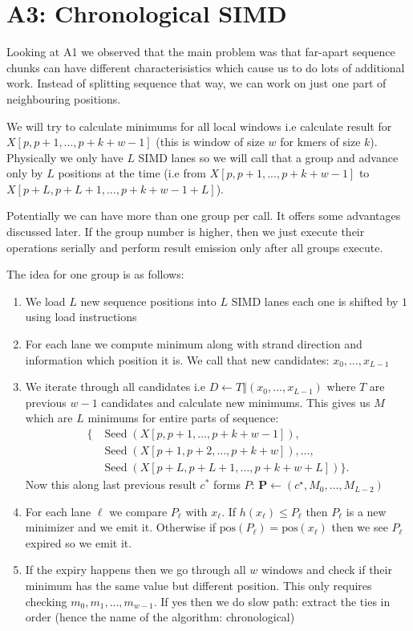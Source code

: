 \section{A3: Chronological SIMD}
\label{sec:rewrite-v8}

Looking at A1 we observed that the main problem was that far-apart sequence chunks can have different characterisistics which cause us to do lots of additional work. Instead of splitting sequence that way, we can work on just one part of neighbouring positions.

We will try to calculate minimums for all local windows i.e calculate result for $X[p, p+1, ..., p+k+w-1]$ (this is window of size $w$ for kmers of size $k$).
Physically we only have $L$ SIMD lanes so we will call that a group and advance only by $L$ positions at the time (i.e from $X[p, p+1, ..., p+k+w-1]$ to $X[p+L, p+L+1, ..., p+k+w-1+L]$).

Potentially we can have more than one group per call. It offers some advantages discussed later. If the group number is higher, then we just execute their operations serially and perform result emission only after all groups execute.

The idea for one group is as follows:
\begin{enumerate}
  \item We load $L$ new sequence positions into $L$ SIMD lanes each one is shifted by $1$ using load instructions
  \item For each lane we compute minimum along with strand direction and information which position it is. We call that new candidates: $x_0,\ldots,x_{L-1}$
  \item We iterate through all candidates i.e $D\gets T\mathbin\Vert(x_0,\ldots,x_{L-1})$ where $T$ are previous $w-1$ candidates and calculate new minimums. This gives us $M$ which are $L$ minimums for entire parts of sequence:
  \[
    \begin{aligned}
      \{&\operatorname{Seed}(X[p,p+1,\ldots,p+k+w-1]),\\
        &\operatorname{Seed}(X[p+1,p+2,\ldots,p+k+w]),\ldots,\\
        &\operatorname{Seed}(X[p+L,p+L+1,\ldots,p+k+w+L])\}.
    \end{aligned}
  \]
  Now this along last previous result $c^{*}$ forms $P$: $\mathbf P\gets(c^\star,M_0,\ldots,M_{L-2})$
  \item For each lane $\ell$ we compare $P_{\ell}$ with $x_{\ell}$. If $h(x_{\ell}) \leq P_{\ell}$ then $P_{\ell}$ is a new minimizer and we emit it. Otherwise if $\text{pos}(P_{\ell}) = \text{pos}(x_{\ell})$ then we see $P_{\ell}$ expired so we emit it. 
  \item If the expiry happens then we go through all $w$ windows and check if their minimum has the same value but different position. This only requires checking $m_0, m_1, ..., m_{w-1}$. If yes then we do slow path: extract the ties in order (hence the name of the algorithm: chronological)
\end{enumerate}

